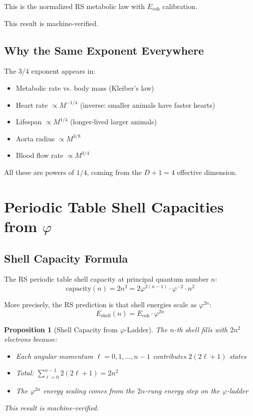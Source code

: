 \documentclass[12pt,a4paper]{article}
\newtheorem{proposition}[theorem]{Proposition}
\theoremstyle{definition}
\theoremstyle{remark}
\begin{document}
This is the normalized RS metabolic law with $E_\mathrm{coh}$ calibration.

This result is machine-verified.

\subsection{Why the Same Exponent Everywhere}

The $3/4$ exponent appears in:
\begin{itemize}
\item Metabolic rate vs. body mass (Kleiber's law)
\item Heart rate $\propto M^{-1/4}$ (inverse: smaller animals have faster hearts)
\item Lifespan $\propto M^{1/4}$ (longer-lived larger animals)
\item Aorta radius $\propto M^{3/8}$
\item Blood flow rate $\propto M^{3/4}$
\end{itemize}

All these are powers of $1/4$, coming from the $D+1 = 4$ effective dimension.

\section{Periodic Table Shell Capacities from $\varphi$}

\subsection{Shell Capacity Formula}

The RS periodic table shell capacity at principal quantum number $n$:
\begin{equation}
\text{capacity}(n) = 2n^2 = 2\varphi^{2(n-1)} \cdot \varphi^{-2} \cdot n^2
\end{equation}

More precisely, the RS prediction is that shell energies scale as $\varphi^{2n}$:
\begin{equation}
E_\mathrm{shell}(n) = E_\mathrm{coh} \cdot \varphi^{2n}
\end{equation}

\begin{proposition}[Shell Capacity from $\varphi$-Ladder]
\label{prop:shellcap}
The $n$-th shell fills with $2n^2$ electrons because:
\begin{itemize}
\item Each angular momentum $\ell = 0, 1, \ldots, n-1$ contributes $2(2\ell+1)$ states
\item Total: $\sum_{\ell=0}^{n-1} 2(2\ell+1) = 2n^2$
\item The $\varphi^{2n}$ energy scaling comes from the $2n$-rung energy step on the $\varphi$-ladder
\end{itemize}
This result is machine-verified.
\end{proposition}
\end{document}
